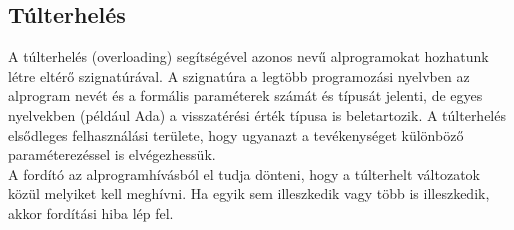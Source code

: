 \documentclass[12pt,margin=0px]{article}
\begin{document}
	\subsection{Túlterhelés}
	
    A túlterhelés (overloading) segítségével azonos nevű alprogramokat hozhatunk létre eltérő szignatúrával. A szignatúra a legtöbb programozási nyelvben az alprogram nevét és a formális paraméterek számát és típusát jelenti, de egyes nyelvekben (például Ada) a visszatérési érték típusa is beletartozik. A túlterhelés elsődleges felhasználási területe, hogy ugyanazt a tevékenységet különböző paraméterezéssel is elvégezhessük.\\
	
    \noindent A fordító az alprogramhívásból el tudja dönteni, hogy a túlterhelt változatok közül melyiket kell meghívni. Ha egyik sem illeszkedik vagy több is illeszkedik, akkor fordítási hiba lép fel.
	
\end{document}
